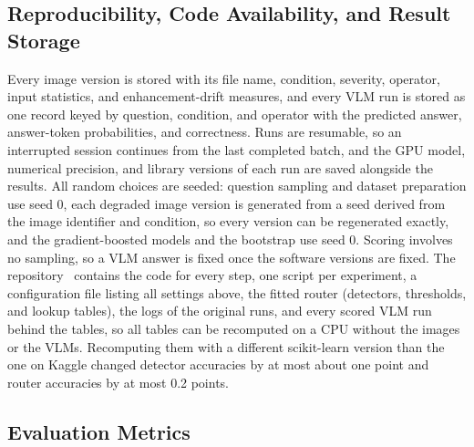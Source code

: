 \documentclass[lettersize,journal]{IEEEtran}
\begin{document}
\subsection{Reproducibility, Code Availability, and Result Storage}

Every image version is stored with its file name, condition, severity, operator, input statistics, and enhancement-drift measures, and every VLM run is stored as one record keyed by question, condition, and operator with the predicted answer, answer-token probabilities, and correctness. Runs are resumable, so an interrupted session continues from the last completed batch, and the GPU model, numerical precision, and library versions of each run are saved alongside the results. All random choices are seeded: question sampling and dataset preparation use seed 0, each degraded image version is generated from a seed derived from the image identifier and condition, so every version can be regenerated exactly, and the gradient-boosted models and the bootstrap use seed 0. Scoring involves no sampling, so a VLM answer is fixed once the software versions are fixed. The repository~\cite{detectthenenhance2026code} contains the code for every step, one script per experiment, a configuration file listing all settings above, the fitted router (detectors, thresholds, and lookup tables), the logs of the original runs, and every scored VLM run behind the tables, so all tables can be recomputed on a CPU without the images or the VLMs. Recomputing them with a different scikit-learn version than the one on Kaggle changed detector accuracies by at most about one point and router accuracies by at most 0.2 points.

\subsection{Evaluation Metrics}
\end{document}
